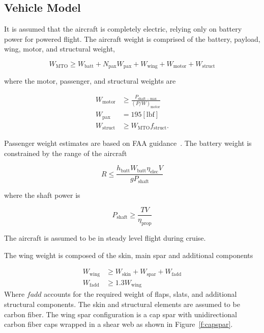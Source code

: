 \documentclass[]{aiaa-tc}%
\begin{document}
\subsection{Vehicle Model}

It is assumed that the aircraft is completely electric, relying only on battery power for powered flight. 
The aircraft weight is comprised of the battery, payload, wing, motor, and structural weight,

\begin{equation}
    W_{\mathrm{MTO}} \geq W_{\mathrm{batt}} + N_{\mathrm{pax}}W_{\mathrm{pax}} + W_{\mathrm{wing}} + W_{\mathrm{motor}} + W_{\mathrm{struct}}
\end{equation}

where the motor, passenger, and structural weights are

\begin{align}
    W_{\mathrm{motor}} &\geq \frac{P_{\mathrm{shaft-max}}}{(P/W)_{\mathrm{motor}}} \\
    W_{\mathrm{pax}} &= 195\mathrm {  [lbf]}\\
    W_{\mathrm{struct}} &\geq W_{\mathrm{MTO}}f_{\mathrm{struct}}.
\end{align}

Passenger weight estimates are based on FAA guidance~\cite{AC120}. The battery weight is constrained by the range of the aircraft

\begin{equation}
    R \leq \frac{h_{\mathrm{batt}} W_{\mathrm{batt}} \eta_{\mathrm{elec}} V}{gP_{\mathrm{shaft}}}
\end{equation}

where the shaft power is 

\begin{equation}
    P_{\mathrm{shaft}} \geq \frac{TV}{\eta_{\mathrm{prop}}}
\end{equation}

The aircraft is assumed to be in steady level flight during cruise. 

The wing weight is composed of the skin, main spar and additional components

\begin{align}
    W_{\mathrm{wing}} &\geq W_{\mathrm{skin}} + W_{\mathrm{spar}} + W_{\mathrm{fadd}} \\
    W_{\mathrm{fadd}} &\geq 1.3W_{\mathrm{wing}} 
\end{align}
Where $fadd$ accounts for the required weight of flaps, slats, and additional structural components. The skin and structural elements are assumed to be carbon fiber.  
The wing spar configuration is a cap spar with unidirectional carbon fiber caps wrapped in a shear web as shown in Figure~\ref{f:capspar}.  
\end{document}
